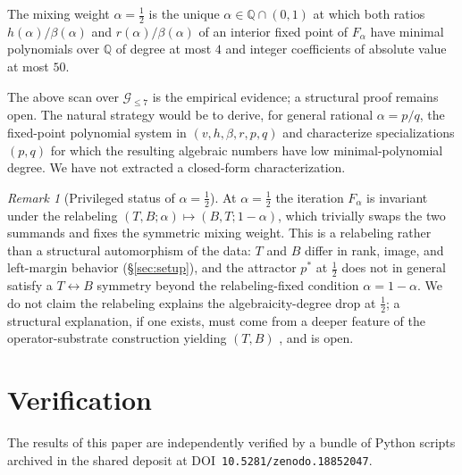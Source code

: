 \documentclass[11pt,reqno]{amsart}
\theoremstyle{plain}
\theoremstyle{definition}
\theoremstyle{remark}
\newtheorem*{remark}{Remark}
\newcommand{\Q}{\mathbb{Q}}
\begin{document}
\begin{conjecture}\label{conj:alpha-unique}
The mixing weight $\alpha = \tfrac12$ is the unique
$\alpha\in\Q\cap(0, 1)$ at which both ratios
$h(\alpha)/\beta(\alpha)$ and $r(\alpha)/\beta(\alpha)$ of an
interior fixed point of $F_{\alpha}$ have minimal polynomials
over $\Q$ of degree at most $4$ and integer coefficients of
absolute value at most $50$.
\end{conjecture}

The above scan over $\mathcal{G}_{\le 7}$ is the empirical
evidence; a structural proof remains open. The natural strategy
would be to derive, for general rational $\alpha = p/q$, the
fixed-point polynomial system in $(v, h, \beta, r, p, q)$ and
characterize specializations $(p, q)$ for which the resulting
algebraic numbers have low minimal-polynomial degree. We have
not extracted a closed-form characterization.

\begin{remark}[Privileged status of $\alpha = \tfrac12$]
At $\alpha = \tfrac12$ the iteration $F_{\alpha}$ is invariant
under the relabeling $(T, B; \alpha)\mapsto (B, T; 1-\alpha)$,
which trivially swaps the two summands and fixes the symmetric
mixing weight. This is a relabeling rather than a structural
automorphism of the data: $T$ and $B$ differ in rank, image,
and left-margin behavior (\S\ref{sec:setup}), and the attractor
$p^*$ at $\tfrac12$ does not in general satisfy a $T \leftrightarrow B$
symmetry beyond the relabeling-fixed condition $\alpha =
1-\alpha$. We do not claim the relabeling explains
the algebraicity-degree drop at $\tfrac12$; a structural
explanation, if one exists, must come from a deeper feature of
the operator-substrate construction yielding $(T, B)$
\cite{SandersGish2026Sigma}, and is open.
\end{remark}

\section{Verification}\label{sec:verify}

The results of this paper are independently verified by a bundle
of Python scripts archived in the shared deposit at
DOI~\texttt{10.5281/zenodo.18852047}.
\end{document}
